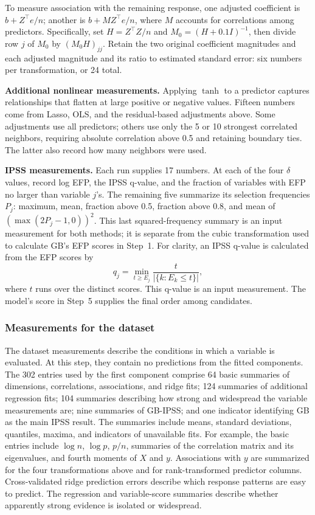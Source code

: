 \documentclass[10pt,letterpaper]{article}
\begin{document}
To measure association with the remaining response, one adjusted
coefficient is $b+Z^\top e/n$; another is
$b+MZ^\top e/n$, where $M$ accounts for correlations among predictors.
Specifically, set $H=Z^\top Z/n$ and $M_0=(H+0.1I)^{-1}$, then divide
row $j$ of $M_0$ by $(M_0H)_{jj}$. Retain the two original coefficient
magnitudes and each adjusted magnitude and its ratio to estimated standard error: six numbers per transformation, or 24 total.

\textbf{Additional nonlinear measurements.} Applying $\tanh$ to a
predictor captures relationships that flatten at large positive or
negative values. Fifteen numbers come from Lasso, OLS, and the
residual-based adjustments above. Some adjustments use all predictors;
others use only the 5 or 10 strongest correlated neighbors, requiring
absolute correlation above 0.5 and retaining boundary ties. The
latter also record how many neighbors were used.

\textbf{IPSS measurements.} Each run supplies 17 numbers. At each
of the four $\delta$ values, record log EFP, the IPSS q-value, and the
fraction of variables with EFP no larger than variable $j$'s. The
remaining five summarize its selection frequencies $P_j$: maximum,
mean, fraction above 0.5, fraction above 0.8, and mean of
$(\max(2P_j-1,0))^2$. This last squared-frequency summary is an
input measurement for both methods; it is separate from the cubic
transformation used to calculate GB's EFP scores in Step~1.
For clarity, an IPSS q-value is calculated from the EFP scores by
\[
 q_j=\min_{t\ge E_j}\frac{t}{|\{k:E_k\le t\}|},
\]
where $t$ runs over the distinct scores. This q-value is an input
measurement. The model's score in Step~5 supplies the final order among candidates.

\subsubsection{Measurements for the dataset}
The dataset measurements describe the conditions in which a variable
is evaluated. At this step, they contain no predictions from the
fitted components.
The 302 entries used by the first component comprise 64 basic
summaries of dimensions, correlations, associations, and ridge fits;
124 summaries of additional regression fits; 104 summaries describing
how strong and widespread the variable measurements are; nine
summaries of GB-IPSS; and one indicator identifying GB as the main
IPSS result. The summaries include means, standard
deviations, quantiles, maxima, and indicators of unavailable fits.
For example, the basic entries include $\log n$, $\log p$, $p/n$,
summaries of the correlation matrix and its eigenvalues, and fourth moments
of $X$ and $y$. Associations with $y$ are summarized for the four
transformations above and for rank-transformed predictor columns.
Cross-validated ridge prediction errors describe which response patterns
are easy to predict. The regression and variable-score summaries describe
whether apparently strong evidence is isolated or widespread.
\end{document}
